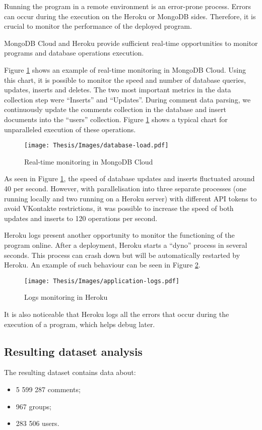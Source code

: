 Running the program in a remote environment is an error-prone process. Errors can occur during the execution on the Heroku or MongoDB sides. Therefore, it is crucial to monitor the performance of the deployed program.

MongoDB Cloud and Heroku provide sufficient real-time opportunities to monitor programs and database operations execution.

Figure \ref{fig:mongodb-monitoring} shows an example of real-time monitoring in MongoDB Cloud. Using this chart, it is possible to monitor the speed and number of database queries, updates, inserts and deletes. The two most important metrics in the data collection step were ``Inserts'' and ``Updates''. During comment data parsing, we continuously update the comments collection in the database and insert documents into the ``users'' collection. Figure \ref{fig:mongodb-monitoring} shows a typical chart for unparalleled execution of these operations.

\begin{figure}
	\centering
	\texttt{[image: Thesis/Images/database-load.pdf]}
	\caption{Real-time monitoring in MongoDB Cloud}
	\label{fig:mongodb-monitoring}
\end{figure}

As seen in Figure \ref{fig:mongodb-monitoring}, the speed of database updates and inserts fluctuated around 40 per second. However, with parallelisation into three separate processes (one running locally and two running on a Heroku server) with different API tokens to avoid VKontakte restrictions, it was possible to increase the speed of both updates and inserts to 120 operations per second.

Heroku logs present another opportunity to monitor the functioning of the program online. After a deployment, Heroku starts a ``dyno'' process in several seconds. This process can crash down but will be automatically restarted by Heroku. An example of such behaviour can be seen in Figure \ref{fig:logs-monitoring}.

\begin{figure}
	\centering
	\texttt{[image: Thesis/Images/application-logs.pdf]}
	\caption{Logs monitoring in Heroku}
	\label{fig:logs-monitoring}
\end{figure}

It is also noticeable that Heroku logs all the errors that occur during the execution of a program, which helps debug later.

\subsection{Resulting dataset analysis}
The resulting dataset contains data about:
\begin{itemize}
    \item 5 599 287 comments;
    \item 967 groups;
    \item 283 506 users.
\end{itemize}

